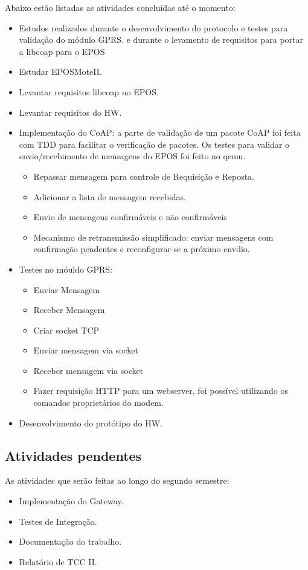 Abaixo est\~ao listadas as atividades conclu\'idas at\'e o momento:
\begin{itemize}
    \item Estudos realizados durante o desenvolvimento do protocolo e testes para valida\c{c}\~ao do m\'odulo GPRS. e durante o levamento de requisitos para portar a libcoap para o EPOS
    \item Estudar EPOSMoteII.
    \item Levantar requisitos libcoap no EPOS.
    \item Levantar requisitos do HW.
    \item Implementa\c{c}\~ao do CoAP: a parte de valida\c{c}\~ao de um pacote CoAP foi feita com TDD para facilitar o verifica\c{c}\~ao de pacotes. Os testes para validar o envio/recebimento de mensagens do EPOS foi feito no qemu.
    \begin{itemize}[noitemsep,topsep=0pt,parsep=0pt,partopsep=0pt]
        \item Repassar mensagem para controle de Requisi\c{c}\~ao e Reposta.
        \item Adicionar a lista de mensagem recebidas.
        \item Envio de mensagens confirm\'aveis e n\~ao confirm\'aveis
        \item Mecanismo de retransmiss\~ao simplificado: enviar mensagens com confirma\c{c}\~ao pendentes e reconfigurar-se a pr\'oximo envdio.
    \end{itemize}
    
    \item Testes no m\'ouldo GPRS:
        \begin{itemize}[noitemsep,topsep=0pt,parsep=0pt,partopsep=0pt]
            \item Enviar Mensagem
            \item Receber Mensagem
            \item Criar socket TCP
            \item Enviar mensagem via socket
            \item Receber mensagem via socket
            \item Fazer requisi\c{c}\~ao HTTP para um webserver, foi poss\'ivel utilizando os comandos propriet\'arios do modem.
        \end{itemize}
    \item Desenvolvimento do prot\'otipo do HW.
\end{itemize}

\subsection{Atividades pendentes}
As atividades que ser\~ao feitas ao longo do segundo semestre:
\begin{itemize}
    \item Implementa\c{c}\~ao do Gateway.
    \item Testes de Integra\c{c}\~ao.
    \item Documenta\c{c}\~ao do trabalho.
    \item Relat\'orio de TCC II.
\end{itemize}
